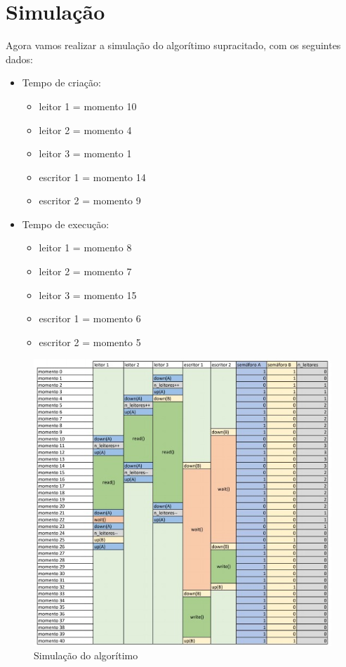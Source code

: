 \documentclass[12pt, a4paper]{article}
\begin{document}
\section{Simulação}

Agora vamos realizar a simulação do algorítimo supracitado, com os seguintes dados:

\begin{multicols}{2}
\begin{itemize}
\footnotesize
	\item Tempo de criação:
	\begin{itemize}
			\item leitor 1 = momento 10
			\item leitor 2 = momento 4
			\item leitor 3 = momento 1
			\item escritor 1 = momento 14
			\item escritor 2 = momento 9
	\end{itemize}
	\item Tempo de execução:
		\begin{itemize}
			\item leitor 1 = momento 8
			\item leitor 2 = momento 7
			\item leitor 3 = momento 15
			\item escritor 1 = momento 6
			\item escritor 2 = momento 5
		\end{itemize}
\end{itemize}
\end{multicols}
	 
\begin{figure}[!htb]
	\centering
	\includegraphics[keepaspectratio, width=.97\textwidth]{tabela.jpeg}
	\caption{\label{fig:tabela.pdf} Simulação do algorítimo}
\end{figure}
\end{document}
